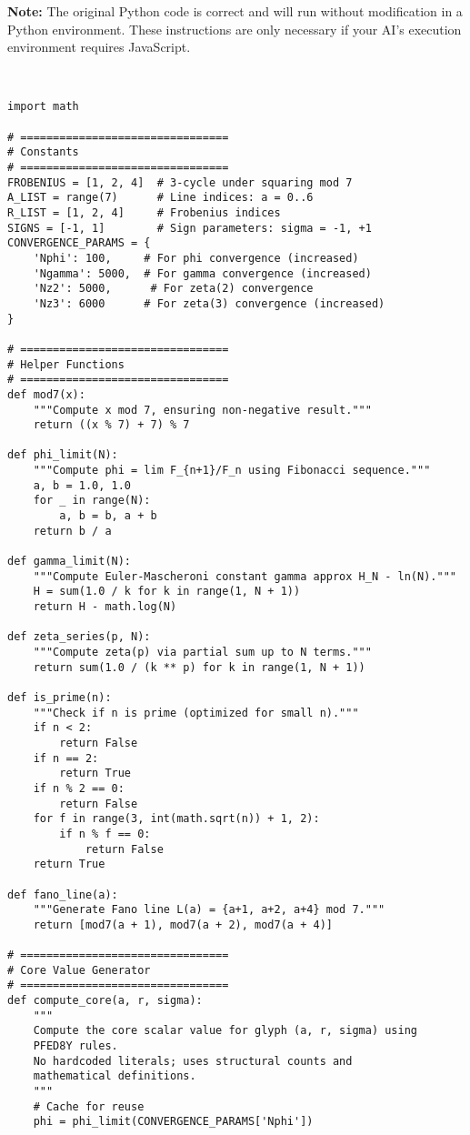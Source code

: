 \documentclass[pdflatex,sn-mathphys-num]{sn-jnl}
\theoremstyle{thmstyleone}
\theoremstyle{thmstyletwo}
\theoremstyle{thmstylethree}
\begin{document}
\begin{appendices}
\begin{tcolorbox}[colback=blue!5!white,colframe=blue!75!black,title=Instructions for Code Execution with AI Assistants]
\textbf{Note:} The original Python code is correct and will run without modification in a Python environment. These instructions are only necessary if your AI's execution environment requires JavaScript.
\end{tcolorbox}

\

\begin{lstlisting}[style=pythonstyle, caption={Kosmoplex Set Generator Implementation}, label={lst:kosmoplex}]
import math

# ================================
# Constants
# ================================
FROBENIUS = [1, 2, 4]  # 3-cycle under squaring mod 7
A_LIST = range(7)      # Line indices: a = 0..6
R_LIST = [1, 2, 4]     # Frobenius indices
SIGNS = [-1, 1]        # Sign parameters: sigma = -1, +1
CONVERGENCE_PARAMS = {
    'Nphi': 100,     # For phi convergence (increased)
    'Ngamma': 5000,  # For gamma convergence (increased)
    'Nz2': 5000,      # For zeta(2) convergence
    'Nz3': 6000      # For zeta(3) convergence (increased)
}

# ================================
# Helper Functions
# ================================
def mod7(x):
    """Compute x mod 7, ensuring non-negative result."""
    return ((x % 7) + 7) % 7

def phi_limit(N):
    """Compute phi = lim F_{n+1}/F_n using Fibonacci sequence."""
    a, b = 1.0, 1.0
    for _ in range(N):
        a, b = b, a + b
    return b / a

def gamma_limit(N):
    """Compute Euler-Mascheroni constant gamma approx H_N - ln(N)."""
    H = sum(1.0 / k for k in range(1, N + 1))
    return H - math.log(N)

def zeta_series(p, N):
    """Compute zeta(p) via partial sum up to N terms."""
    return sum(1.0 / (k ** p) for k in range(1, N + 1))

def is_prime(n):
    """Check if n is prime (optimized for small n)."""
    if n < 2:
        return False
    if n == 2:
        return True
    if n % 2 == 0:
        return False
    for f in range(3, int(math.sqrt(n)) + 1, 2):
        if n % f == 0:
            return False
    return True

def fano_line(a):
    """Generate Fano line L(a) = {a+1, a+2, a+4} mod 7."""
    return [mod7(a + 1), mod7(a + 2), mod7(a + 4)]

# ================================
# Core Value Generator
# ================================
def compute_core(a, r, sigma):
    """
    Compute the core scalar value for glyph (a, r, sigma) using
    PFED8Y rules.
    No hardcoded literals; uses structural counts and
    mathematical definitions.
    """
    # Cache for reuse
    phi = phi_limit(CONVERGENCE_PARAMS['Nphi'])
    

\end{lstlisting}
\end{appendices}
\end{document}
